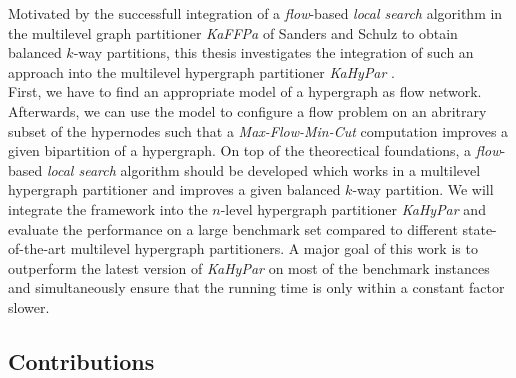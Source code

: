 Motivated by the successfull integration of a \emph{flow}-based \emph{local search} algorithm in the multilevel graph 
partitioner \emph{KaFFPa} of Sanders and Schulz \cite{sanders2011engineering} to obtain balanced $k$-way
partitions, this thesis investigates the integration of such an approach into the multilevel hypergraph
partitioner \emph{KaHyPar} \cite{heuer2017improving}.\\
First, we have to find an appropriate model of a hypergraph as flow network. Afterwards, 
we can use the model to configure a flow problem on an abritrary subset of the hypernodes
such that a \emph{Max-Flow-Min-Cut} computation improves a given bipartition of a hypergraph.
On top of the theorectical foundations, a \emph{flow}-based \emph{local search} algorithm
should be developed which works in a multilevel hypergraph partitioner and improves a given
balanced $k$-way partition. We will integrate the framework into the
$n$-level hypergraph partitioner \emph{KaHyPar} \cite{heuer2017improving} and evaluate
the performance on a large benchmark set compared to different state-of-the-art 
multilevel hypergraph partitioners. A major goal of this work is to outperform the 
latest version of \emph{KaHyPar} on most of the benchmark instances and simultaneously
ensure that the running time is only within a constant factor slower.

\subsection{Contributions}

